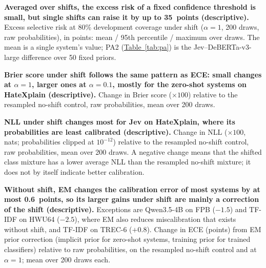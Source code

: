 \begin{table}[htbp]
  \centering
  \caption{\textbf{Averaged over shifts, the excess risk of a fixed confidence threshold is small, but single shifts can
  raise it by up to 35~points (descriptive).} Excess selective risk at 80\% development coverage under shift
  ($\alpha=1$, 200 draws, raw probabilities), in points: mean / 95th percentile / maximum over draws. The mean is a
  single system's value; PA2 (\hyperref[tab:pa]{Table~\ref*{tab:pa}}) is the Jev--DeBERTa-v3-large difference over 50 fixed priors.}
  \label{tab:excess}
  \scriptsize
  \setlength{\tabcolsep}{3pt}
  
\end{table}

\begin{table}[htbp]
  \centering
  \caption{\textbf{Brier score under shift follows the same pattern as ECE: small changes at $\alpha=1$, larger ones at
  $\alpha=0.1$, mostly for the zero-shot systems on HateXplain (descriptive).} Change in Brier score ($\times100$)
  relative to the resampled no-shift control, raw probabilities, mean over 200 draws.}
  \label{tab:brier}
  \scriptsize
  \setlength{\tabcolsep}{3pt}
  
\end{table}

\begin{table}[htbp]
  \centering
  \caption{\textbf{NLL under shift changes most for Jev on HateXplain, where its probabilities are least calibrated
  (descriptive).} Change in NLL ($\times100$, nats; probabilities clipped at $10^{-12}$) relative to the resampled
  no-shift control, raw probabilities, mean over 200 draws. A negative change means that the shifted class mixture has
  a lower average NLL than the resampled no-shift mixture; it does not by itself indicate better calibration.}
  \label{tab:nll}
  \scriptsize
  \setlength{\tabcolsep}{3pt}
  
\end{table}

\begin{table}[htbp]
  \centering
  \caption{\textbf{Without shift, EM changes the calibration error of most systems by at most 0.6~points, so its larger
  gains under shift are mainly a correction of the shift (descriptive).} Exceptions are Qwen3.5-4B on FPB ($-1.5$) and
  TF-IDF on HWU64 ($-2.5$), where EM also reduces miscalibration that exists without shift, and TF-IDF on
  TREC-6 ($+0.8$). Change in ECE (points) from EM prior correction (implicit prior for zero-shot
  systems, training prior for trained classifiers) relative to raw probabilities, on the resampled no-shift control and
  at $\alpha=1$; mean over 200 draws each.}
  \label{tab:emnoshift}
  \scriptsize
  \setlength{\tabcolsep}{3pt}
  
\end{table}

